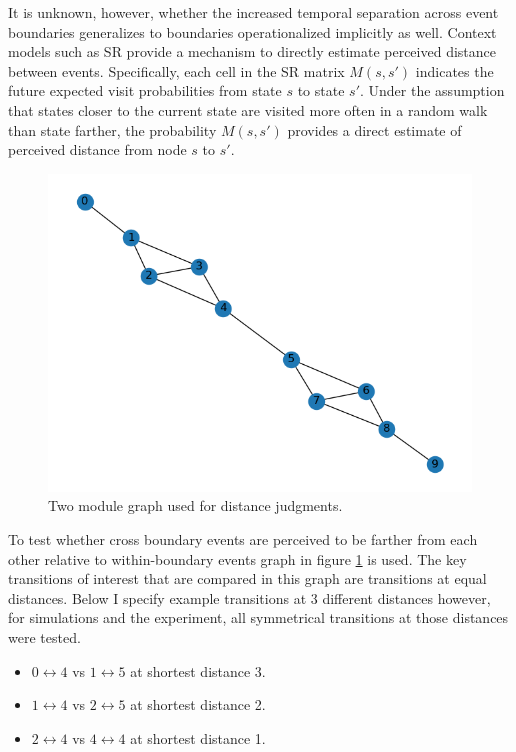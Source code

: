 It is unknown, however, whether the increased temporal separation across event boundaries generalizes to boundaries operationalized implicitly as well. Context models such as SR provide a mechanism to directly estimate perceived distance between events. Specifically, each cell in the SR matrix $M(s, s')$ indicates the future expected visit probabilities from state $s$ to state $s'$. Under the assumption that states closer to the current state are visited more often in a random walk than state farther, the probability $M(s, s')$ provides a direct estimate of perceived distance from node $s$ to $s'$. 

\begin{figure}[ht]
    \centering
    \label{fig:two_module_graph}
    \includegraphics[width = \textwidth]{chapter_notebooks/chapter_3/figures/two_module_graph.png}
    \caption{Two module graph used for distance judgments.}
\end{figure}

To test whether cross boundary events are perceived to be farther from each other relative to within-boundary events graph in figure \ref{fig:two_module_graph} is used. The key transitions of interest that are compared in this graph are transitions at equal distances. Below I specify example transitions at 3 different distances however, for simulations and the experiment, all symmetrical transitions at those distances were tested. 
\begin{itemize}
    \item $0 \leftrightarrow 4$ vs $1 \leftrightarrow 5$ at shortest distance 3. 
    \item $1 \leftrightarrow 4$ vs $2 \leftrightarrow 5$ at shortest distance 2. 
    \item $2 \leftrightarrow 4$ vs $4 \leftrightarrow 4$ at shortest distance 1. 
\end{itemize}

